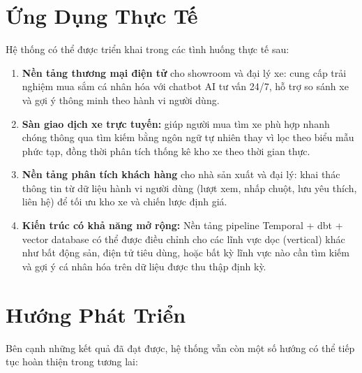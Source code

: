 \section{Ứng Dụng Thực Tế}

Hệ thống có thể được triển khai trong các tình huống thực tế sau:

\begin{enumerate}
    \item \textbf{Nền tảng thương mại điện tử} cho showroom và đại lý xe: cung cấp trải nghiệm mua sắm cá nhân hóa với chatbot AI tư vấn 24/7, hỗ trợ so sánh xe và gợi ý thông minh theo hành vi người dùng.

    \item \textbf{Sàn giao dịch xe trực tuyến:} giúp người mua tìm xe phù hợp nhanh chóng thông qua tìm kiếm bằng ngôn ngữ tự nhiên thay vì lọc theo biểu mẫu phức tạp, đồng thời phân tích thống kê kho xe theo thời gian thực.

    \item \textbf{Nền tảng phân tích khách hàng} cho nhà sản xuất và đại lý: khai thác thông tin từ dữ liệu hành vi người dùng (lượt xem, nhấp chuột, lưu yêu thích, liên hệ) để tối ưu kho xe và chiến lược định giá.

    \item \textbf{Kiến trúc có khả năng mở rộng:} Nền tảng pipeline Temporal + dbt + vector database có thể được điều chỉnh cho các lĩnh vực dọc (vertical) khác như bất động sản, điện tử tiêu dùng, hoặc bất kỳ lĩnh vực nào cần tìm kiếm và gợi ý cá nhân hóa trên dữ liệu được thu thập định kỳ.
\end{enumerate}

\section{Hướng Phát Triển}

Bên cạnh những kết quả đã đạt được, hệ thống vẫn còn một số hướng có thể tiếp tục hoàn thiện trong tương lai:

